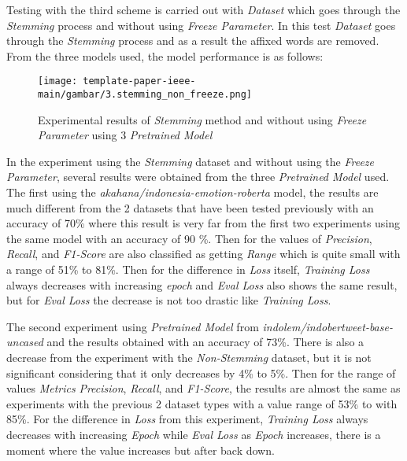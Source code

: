 Testing with the third scheme is carried out with \textit{Dataset} which goes through the \textit{Stemming} process and without using \textit{Freeze Parameter}. In this test \textit{Dataset} goes through the \textit{Stemming} process and as a result the affixed words are removed. From the three models used, the model performance is as follows:

\begin{figure}[h]
    \begin{center}
        \texttt{[image: template-paper-ieee-main/gambar/3.stemming\_non\_freeze.png]}
        \caption{Experimental results of \textit{Stemming} method and without using \textit{Freeze Parameter} using 3 \textit{Pretrained Model}}
        \label{fig: bertToken}
    \end{center}
\end{figure}

In the experiment using the \textit{Stemming} dataset and without using the \textit{Freeze Parameter}, several results were obtained from the three \textit{Pretrained Model} used. The first using the \textit{akahana/indonesia-emotion-roberta} model, the results are much different from the 2 datasets that have been tested previously with an accuracy of 70\% where this result is very far from the first two experiments using the same model with an accuracy of 90 \%. Then for the values of \textit{Precision}, \textit{Recall}, and \textit{F1-Score} are also classified as getting \textit{Range} which is quite small with a range of 51\% to 81\%. Then for the difference in \textit{Loss} itself, \textit{Training Loss} always decreases with increasing \textit{epoch} and \textit{Eval Loss} also shows the same result, but for \textit{Eval Loss} the decrease is not too drastic like \textit{Training Loss}.

The second experiment using \textit{Pretrained Model} from \textit{indolem/indobertweet-base-uncased} and the results obtained with an accuracy of 73\%. There is also a decrease from the experiment with the \textit{Non-Stemming} dataset, but it is not significant considering that it only decreases by 4\% to 5\%. Then for the range of values \textit{Metrics} \textit{Precision}, \textit{Recall}, and \textit{F1-Score}, the results are almost the same as experiments with the previous 2 dataset types with a value range of 53\% to with 85\%. For the difference in \textit{Loss} from this experiment, \textit{Training Loss} always decreases with increasing \textit{Epoch} while \textit{Eval Loss} as \textit{Epoch} increases, there is a moment where the value increases but after back down.

